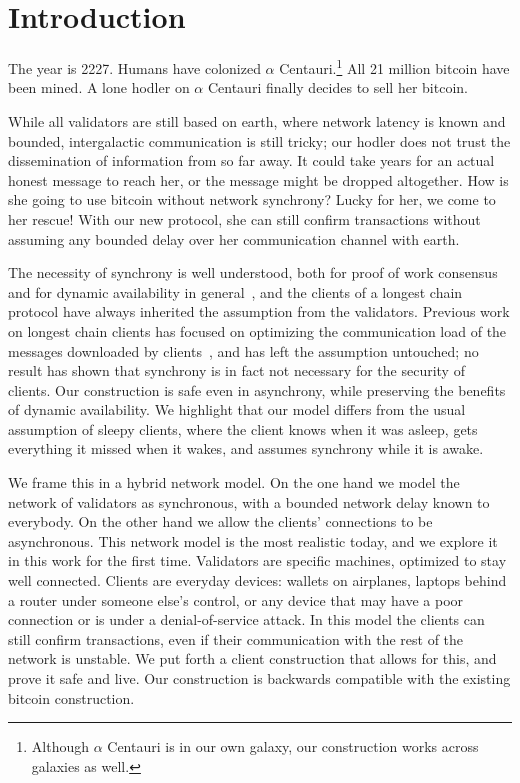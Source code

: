 \section{Introduction}
\label{sec.intro}

The year is 2227. Humans have colonized $\alpha$
Centauri.\footnote{Although $\alpha$ Centauri is in our own galaxy, our
construction works across galaxies as well.} All 21 million
bitcoin have been mined. A lone hodler on $\alpha$ Centauri finally decides to
sell her bitcoin.

While all validators are still based on earth, where network latency is known
and bounded, intergalactic communication is still tricky; our hodler does not
trust the dissemination of information from so far away. It could take years for
an actual honest message to reach her, or the message might be dropped
altogether. How is she going to use bitcoin without network synchrony? Lucky for
her, we come to her rescue! With our new protocol, she can still confirm
transactions without assuming any bounded delay over her communication channel
with earth.



The necessity of synchrony is well understood, both for proof of work consensus
and for dynamic availability in
general~\cite{accountable-safety,ebbflow,cuamdr}, and the clients of a longest
chain protocol have always inherited the assumption from the validators.
Previous work on longest chain clients has focused on optimizing the
communication load of the messages downloaded by
clients~\cite{nipopow,flyclient,blink}, and has left the assumption untouched;
no result has shown that synchrony is in fact not necessary for the security of
clients. Our construction is safe even in asynchrony, while preserving the
benefits of dynamic availability. We highlight that our model differs from the
usual assumption of sleepy clients, where the client knows when it was asleep,
gets everything it missed when it wakes, and assumes synchrony while it is
awake.

We frame this in a hybrid network model. On the one hand we model the network of
validators as synchronous, with a bounded network delay known to everybody. On
the other hand we allow the clients' connections to be asynchronous. This
network model is the most realistic today, and we explore it in this work for
the first time. Validators are specific machines, optimized to stay well
connected. Clients are everyday devices: wallets on airplanes, laptops behind a
router under someone else's control, or any device that may have a poor
connection or is under a denial-of-service attack. In this model the clients can
still confirm transactions, even if their communication with the rest of the
network is unstable. We put forth a client construction that allows for this,
and prove it safe and live. Our construction is backwards compatible with the
existing bitcoin construction.

